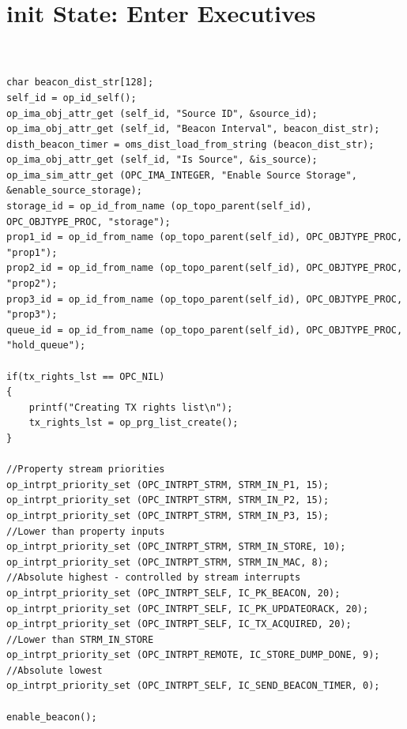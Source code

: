 \section{init State: Enter Executives}
{\tiny
\begin{verbatim}


char beacon_dist_str[128];
self_id = op_id_self();
op_ima_obj_attr_get (self_id, "Source ID", &source_id);
op_ima_obj_attr_get (self_id, "Beacon Interval", beacon_dist_str);
disth_beacon_timer = oms_dist_load_from_string (beacon_dist_str);
op_ima_obj_attr_get (self_id, "Is Source", &is_source);
op_ima_sim_attr_get (OPC_IMA_INTEGER, "Enable Source Storage", &enable_source_storage);
storage_id = op_id_from_name (op_topo_parent(self_id), OPC_OBJTYPE_PROC, "storage");
prop1_id = op_id_from_name (op_topo_parent(self_id), OPC_OBJTYPE_PROC, "prop1");
prop2_id = op_id_from_name (op_topo_parent(self_id), OPC_OBJTYPE_PROC, "prop2");
prop3_id = op_id_from_name (op_topo_parent(self_id), OPC_OBJTYPE_PROC, "prop3");
queue_id = op_id_from_name (op_topo_parent(self_id), OPC_OBJTYPE_PROC, "hold_queue");

if(tx_rights_lst == OPC_NIL)
{
	printf("Creating TX rights list\n");
	tx_rights_lst = op_prg_list_create();
}

//Property stream priorities
op_intrpt_priority_set (OPC_INTRPT_STRM, STRM_IN_P1, 15);
op_intrpt_priority_set (OPC_INTRPT_STRM, STRM_IN_P2, 15);
op_intrpt_priority_set (OPC_INTRPT_STRM, STRM_IN_P3, 15);
//Lower than property inputs
op_intrpt_priority_set (OPC_INTRPT_STRM, STRM_IN_STORE, 10);
op_intrpt_priority_set (OPC_INTRPT_STRM, STRM_IN_MAC, 8);
//Absolute highest - controlled by stream interrupts
op_intrpt_priority_set (OPC_INTRPT_SELF, IC_PK_BEACON, 20);
op_intrpt_priority_set (OPC_INTRPT_SELF, IC_PK_UPDATEORACK, 20);
op_intrpt_priority_set (OPC_INTRPT_SELF, IC_TX_ACQUIRED, 20);
//Lower than STRM_IN_STORE
op_intrpt_priority_set (OPC_INTRPT_REMOTE, IC_STORE_DUMP_DONE, 9);
//Absolute lowest
op_intrpt_priority_set (OPC_INTRPT_SELF, IC_SEND_BEACON_TIMER, 0);

enable_beacon();

\end{verbatim}
}

